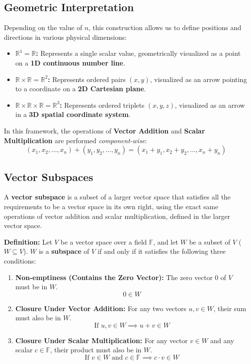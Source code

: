 \documentclass[11pt, a4paper]{article}
\begin{document}
	\subsection*{Geometric Interpretation}\nopagebreak
	\noindent Depending on the value of $n$, this construction allows us to define positions and directions in various physical dimensions:\nopagebreak
	\begin{itemize}
		\setlength{\itemsep}{0pt} %
		\item \textbf{$\mathbb{R}^1 = \mathbb{R}$:} Represents a single scalar value, geometrically visualized as a point on a \textbf{1D continuous number line}.
		\newpage %
		\item \textbf{$\mathbb{R} \times \mathbb{R} = \mathbb{R}^2$:} Represents ordered pairs $(x, y)$, visualized as an arrow pointing to a coordinate on a \textbf{2D Cartesian plane}.
		\item \textbf{$\mathbb{R} \times \mathbb{R} \times \mathbb{R} = \mathbb{R}^3$:} Represents ordered triplets $(x, y, z)$, visualized as an arrow in a \textbf{3D spatial coordinate system}.
	\end{itemize}
	
	\noindent In this framework, the operations of \textbf{Vector Addition} and \textbf{Scalar Multiplication} are performed \textit{component-wise}:
	\[
	(x_1, x_2, \dots, x_n) + (y_1, y_2, \dots, y_n) = (x_1 + y_1, x_2 + y_2, \dots, x_n + y_n)
	\]
	
	\subsection{Vector Subspaces}
	A \textbf{vector subspace} is a subset of a larger vector space that satisfies all the requirements to be a vector space in its own right, using the exact same operations of vector addition and scalar multiplication, defined in the larger vector space. \newline 
	
	\noindent \textbf{Definition:} Let $V$ be a vector space over a field $\mathbb{F}$, and let $W$ be a subset of $V$ ($W \subseteq V$). $W$ is a \textbf{subspace} of $V$ if and only if it satisfies the following three conditions:
	
	\begin{enumerate}
		\item \textbf{Non-emptiness (Contains the Zero Vector):} The zero vector $0$ of $V$ must be in $W$.
		\[ 0 \in W \]
		
		\item \textbf{Closure Under Vector Addition:} For any two vectors $u, v \in W$, their sum must also be in $W$.
		\[ \text{If } u, v \in W \implies u + v \in W \]
		
		\item \textbf{Closure Under Scalar Multiplication:} For any vector $v \in W$ and any scalar $c \in \mathbb{F}$, their product must also be in $W$.
		\[ \text{If } v \in W \text{ and } c \in \mathbb{F} \implies c \cdot v \in W \]
	\end{enumerate}
	
\end{document}
